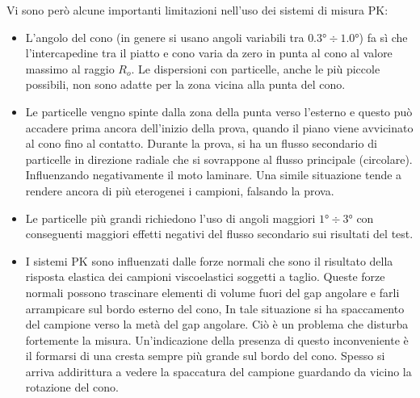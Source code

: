 Vi sono però alcune importanti limitazioni nell'uso dei sistemi di misura \ac{PK}:
\begin{itemize}
\item L'angolo del cono (in genere si usano angoli variabili tra $0.3\unit{\degree} \div 1.0\unit{\degree}$) fa sì che l'intercapedine tra il piatto e cono varia da zero in punta al cono al valore massimo al raggio $R_o$. Le dispersioni con particelle, anche le più piccole possibili, non sono adatte per la zona vicina alla punta del cono.
\item Le particelle vengno spinte dalla zona della punta verso l'esterno e questo può accadere prima ancora dell'inizio della prova, quando il piano viene avvicinato al cono fino al contatto. Durante la prova, si ha un flusso secondario di particelle in direzione radiale che si sovrappone al flusso principale (circolare). Influenzando negativamente il moto laminare. Una simile situazione tende a rendere ancora di più eterogenei i campioni, falsando la prova.
\item Le particelle più grandi richiedono l'uso di angoli maggiori $1\unit{\degree} \div 3\unit{\degree}$ con conseguenti maggiori effetti negativi del flusso secondario sui risultati del test.
\item I sistemi \ac{PK} sono influenzati dalle forze normali che sono il risultato della risposta elastica dei campioni viscoelastici soggetti a taglio.
Queste forze normali possono trascinare elementi di volume fuori del gap angolare e farli arrampicare sul bordo esterno del cono, In tale situazione si ha spaccamento del campione verso la metà del gap angolare. Ciò è un problema che disturba fortemente la misura.
Un'indicazione della presenza di questo inconveniente è il formarsi di una cresta sempre più grande sul bordo del cono. Spesso si arriva addirittura a vedere la spaccatura del campione guardando da vicino la rotazione del cono.
\end{itemize} 

